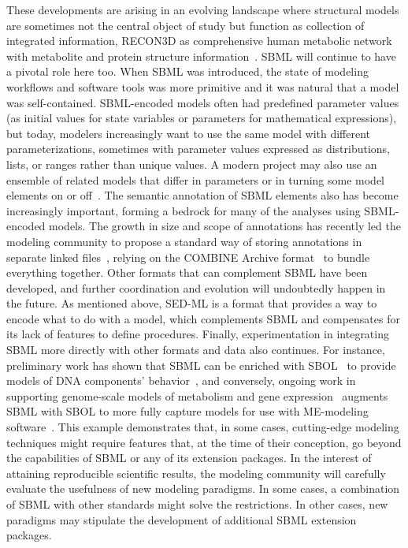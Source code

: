 \documentclass{sbml-paper}
\begin{document}
These developments are arising in an evolving landscape where structural models are sometimes not the central object of study but function as collection of integrated information, \eg RECON3D as comprehensive human metabolic network with metabolite and protein structure information~\citep{brunk2018}.  SBML will continue to have a pivotal role here too.
When SBML was introduced, the state of modeling workflows and software tools was more primitive and it was natural that a model was self-contained.  SBML-encoded models often had predefined parameter values (\eg as initial values for state variables or parameters for mathematical expressions), but today, modelers increasingly want to use the same model with different parameterizations, sometimes with parameter values expressed as distributions, lists, or ranges rather than unique values.  A modern project may also use an ensemble of related models that differ in parameters or in turning some model elements on or off~\citep{kuepfer2007ensemble}.  The semantic annotation of SBML elements also has become increasingly important, forming a bedrock for many of the analyses using SBML-encoded models.  The growth in size and scope of annotations has recently led the modeling community to propose a standard way of storing annotations in separate linked files~\citep{Neal2019harmonizing}, relying on the COMBINE Archive format~\citep{bergmann2014combine} to bundle everything together.  Other formats that can complement SBML have been developed, and further coordination and evolution will undoubtedly happen in the future.  As mentioned above, SED-ML is a format that provides a way to encode what to do with a model, which complements SBML and compensates for its lack of features to define procedures.  Finally, experimentation in integrating SBML more directly with other formats and data also continues.  For instance, preliminary work has shown that SBML can be enriched with SBOL~\citep{voigt2018sbmlme} to provide models of DNA components' behavior~\citep{Roehner2014a}, and conversely, ongoing work in supporting genome-scale models of metabolism and gene expression~\citep[known as \emph{ME-models}, ][]{Thiele2012multiscale} augments SBML with SBOL to more fully capture models for use with ME-modeling software~\citep{galdzicki_2014}.
This example demonstrates that, in some cases, cutting-edge modeling techniques might require features that, at the time of their conception, go beyond the capabilities of SBML or any of its extension packages. In the interest of attaining reproducible scientific results, the modeling community will carefully evaluate the usefulness of new modeling paradigms. In some cases, a combination of SBML with other standards might solve the restrictions. In other cases, new paradigms may stipulate the development of additional SBML extension packages.
\end{document}
